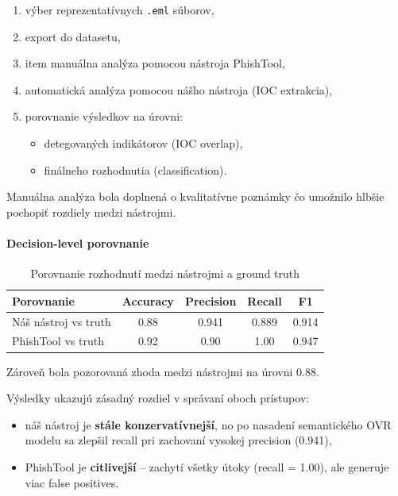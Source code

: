 \documentclass[conference]{IEEEtran}
\begin{document}
\begin{enumerate}
    \item výber reprezentatívnych \texttt{.eml} súborov,
    \item export do datasetu,
    \item item manuálna analýza pomocou nástroja PhishTool,
    \item automatická analýza pomocou nášho nástroja (IOC extrakcia),
    \item porovnanie výsledkov na úrovni:
    \begin{itemize}
        \item detegovaných indikátorov (IOC overlap),
        \item finálneho rozhodnutia (classification).
    \end{itemize}
\end{enumerate}

Manuálna analýza bola doplnená o kvalitatívne poznámky
čo umožnilo hlbšie pochopiť rozdiely medzi nástrojmi.

\paragraph{Decision-level porovnanie}

\begin{table}[H]
\centering
\caption{Porovnanie rozhodnutí medzi nástrojmi a ground truth}
\begin{tabular}{lcccc}
\hline
Porovnanie & Accuracy & Precision & Recall & F1 \\
\hline
Náš nástroj vs truth & 0.88 & 0.941 & 0.889 & 0.914 \\
PhishTool vs truth & 0.92 & 0.90 & 1.00 & 0.947 \\
\hline
\end{tabular}

\end{table}

Zároveň bola pozorovaná zhoda medzi nástrojmi na úrovni 0.88.

Výsledky ukazujú zásadný rozdiel v správaní oboch prístupov:

\begin{itemize}
    \item náš nástroj je \textbf{stále konzervatívnejší}, no po nasadení semantického OVR modelu sa zlepšil recall pri zachovaní vysokej precision (0.941),
    \item PhishTool je \textbf{citlivejší} – zachytí všetky útoky (recall = 1.00),
    ale generuje viac false positives.
\end{itemize}
\end{document}
